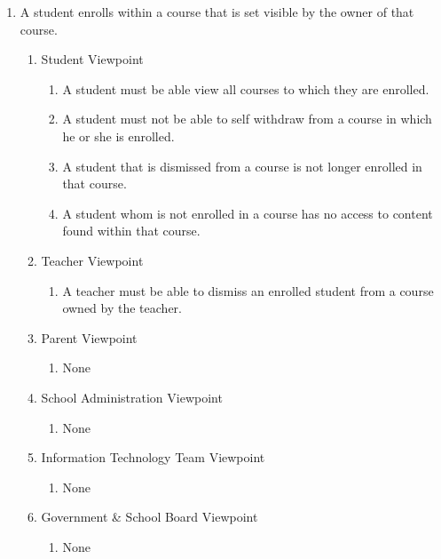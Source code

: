 \documentclass[]{article}
\begin{document}
\begin{enumerate}[{BE}1.]
	\item A student enrolls within a course that is set visible by the owner of that course.
	\begin{enumerate}[{VP2}.1]
		\item Student Viewpoint
			\begin{enumerate}
				\item A student must be able view all courses to which they are enrolled.
				\item A student must not be able to self withdraw from a course in which he or she is enrolled.
				\item A student that is dismissed from a course is not longer enrolled in that course.
				\item A student whom is not enrolled in a course has no access to content found within that course.
			\end{enumerate}
		\item Teacher Viewpoint
			\begin{enumerate}
				\item A teacher must be able to dismiss an enrolled student from a course owned by the teacher.
			\end{enumerate}
		\item Parent Viewpoint
			\begin{enumerate}
				\item None
			\end{enumerate}
		\item School Administration Viewpoint
			\begin{enumerate}
				\item None
			\end{enumerate}
		\item Information Technology Team Viewpoint
			\begin{enumerate}
				\item None
			\end{enumerate}
		\item Government \& School Board Viewpoint
			\begin{enumerate}
				\item None
			\end{enumerate}
	\end{enumerate}


\end{enumerate}
\end{document}
